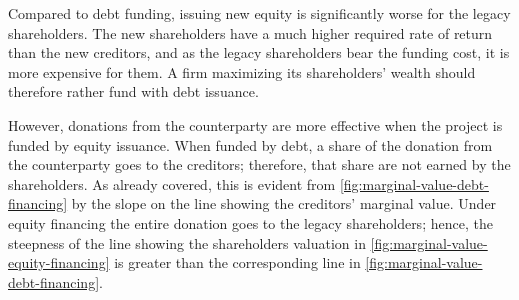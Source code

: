 \documentclass[main.tex]{subfiles}
\begin{document}
        Compared to debt funding, 
        issuing new equity is significantly worse for the legacy shareholders.
        The new shareholders have a much higher required rate of return than the new creditors,
        and as the legacy shareholders bear the funding cost, it is more expensive for them.
        A firm maximizing its shareholders' wealth should therefore rather fund with debt issuance.

        However, donations from the counterparty are more effective
        when the project is funded by equity issuance.
        When funded by debt, a share of the donation from the counterparty goes to the creditors;
        therefore, that share are not earned by the shareholders.
        As already covered, this is evident from \cref{fig:marginal-value-debt-financing}
        by the slope on the line showing the creditors' marginal value.
        Under equity financing the entire donation goes to the legacy shareholders;
        hence, the steepness of the line showing the shareholders valuation in 
        \cref{fig:marginal-value-equity-financing} is greater than the corresponding line in 
        \cref{fig:marginal-value-debt-financing}.
\end{document}
